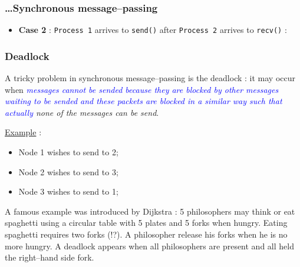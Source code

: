 \documentclass{beamer}
\begin{document}
\begin{frame}
\frametitle{\ldots Synchronous message--passing}
\begin{itemize}
\item \textbf{Case 2} : \texttt{Process 1} arrives to \texttt{send()} after
  \texttt{Process 2} arrives to \texttt{recv()} :
  \begin{figure}
    \centering
  \end{figure}
\end{itemize}
\end{frame}

\begin{frame}
\frametitle{Deadlock}

A tricky problem in synchronous message--passing is the \alert{deadlock} :
it may occur when \textit{\textcolor{blue}{messages cannot be sended because
they are blocked by other messages waiting to be sended and these packets
are blocked in a similar way such that actually} \alert{none of the messages can be send}}.

\underline{Example} : 
\begin{itemize}
\item Node 1 wishes to send to 2;
\item Node 2 wishes to send to 3;
\item Node 3 wishes to send to 1;
\end{itemize}
A famous example was introduced by Dijkstra : \alert{5 philosophers}
may think or eat spaghetti using a circular table with 5 plates and 5 forks when hungry.
Eating spaghetti requires two forks (!?). 
A philosopher release his forks when he is no more hungry.
A deadlock appears when all philosophers are present and all held the right--hand side fork.
\end{frame}
\end{document}

